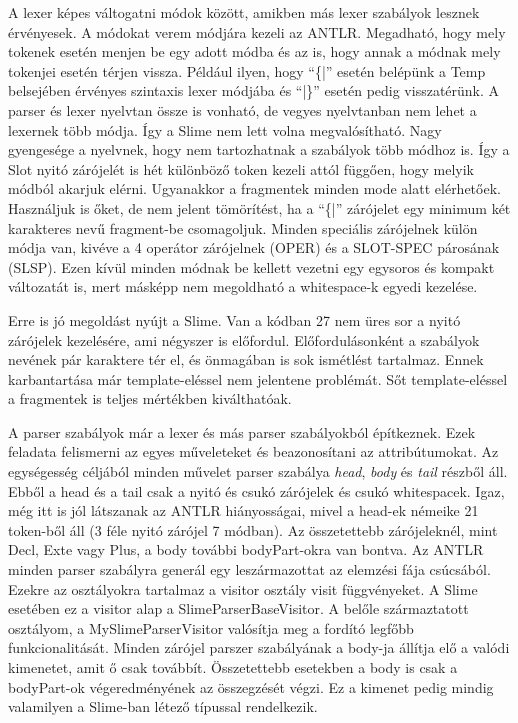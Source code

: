 {A lexer képes váltogatni módok között, amikben más lexer szabályok lesznek érvényesek. 
A módokat verem módjára kezeli az ANTLR. 
Megadható, hogy mely tokenek esetén menjen be egy adott módba és az is, hogy annak a módnak mely tokenjei esetén térjen vissza. 
Például ilyen, hogy “\{|” esetén belépünk a Temp belsejében érvényes szintaxis lexer módjába és “|\}” esetén pedig visszatérünk. 
A parser és lexer nyelvtan össze is vonható, de vegyes nyelvtanban nem lehet a lexernek több módja.
Így a Slime nem lett volna megvalósítható.
Nagy gyengesége a nyelvnek, hogy nem tartozhatnak a szabályok több módhoz is. 
Így a Slot nyitó zárójelét is hét különböző token kezeli attól függően, hogy melyik módból akarjuk elérni. 
Ugyanakkor a fragmentek  minden mode alatt elérhetőek. 
Használjuk is őket, de nem jelent tömörítést, ha a “\{|” zárójelet egy minimum két karakteres nevű fragment-be csomagoljuk.
Minden speciális zárójelnek külön módja van, kivéve a 4 operátor zárójelnek (OPER) és a SLOT-SPEC párosának (SLSP). 
Ezen kívül minden módnak be kellett vezetni egy egysoros és kompakt változatát is, mert másképp nem megoldható a whitespace-k egyedi kezelése.

Erre is jó megoldást nyújt a Slime. 
Van a kódban 27 nem üres sor a nyitó zárójelek kezelésére, ami négyszer is előfordul.
Előfordulásonként a szabályok nevének pár karaktere tér el, és önmagában is sok ismétlést tartalmaz. 
Ennek karbantartása már template-eléssel nem jelentene problémát. 
Sőt template-eléssel a fragmentek is teljes mértékben kiválthatóak.

A parser szabályok már a lexer és más parser szabályokból építkeznek. 
Ezek feladata felismerni az egyes műveleteket és beazonosítani az attribútumokat. 
Az egységesség céljából minden művelet parser szabálya \textit{head}, \textit{body} és \textit{tail} részből áll.
Ebből a head és a tail csak a nyitó és csukó zárójelek és csukó whitespacek. 
Igaz, még itt is jól látszanak az ANTLR hiányosságai, mivel a head-ek némeike 21 token-ből áll (3 féle nyitó zárójel 7 módban). 
Az összetettebb zárójeleknél, mint Decl, Exte vagy Plus, a body további bodyPart-okra van bontva. 
Az ANTLR minden parser szabályra generál egy leszármazottat az elemzési fája csúcsából. 
Ezekre az osztályokra tartalmaz a visitor osztály visit függvényeket. 
A Slime esetében ez a visitor alap a SlimeParserBaseVisitor.
A belőle származtatott osztályom, a MySlimeParserVisitor valósítja meg a fordító legfőbb funkcionalitását. 
Minden zárójel parszer szabályának a body-ja állítja elő a valódi kimenetet, amit ő csak továbbít. 
Összetettebb esetekben a body is csak a bodyPart-ok végeredményének az összegzését végzi. 
Ez a kimenet pedig mindig valamilyen a Slime-ban létező típussal rendelkezik.

}
